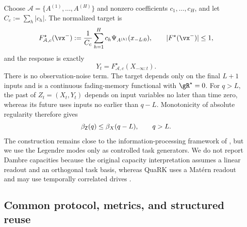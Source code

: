 Choose $\mathcal A=\{A^{(1)},\ldots,A^{(H)}\}$ and nonzero coefficients
$c_1,\ldots,c_H$, and let $C_c:=\sum_h|c_h|$.  The normalized target is
\begin{equation}
    F_{\mathcal A,c}^\star(\vx^-)
    :=\frac1{C_c}\sum_{h=1}^{H}c_h\Psi_{A^{(h)}}(x_{-L:0}),
    \qquad |F^\star(\vx^-)|\leq1,
    \label{eq:empirical-target-functional}
\end{equation}
and the response is exactly
\begin{equation}
    Y_t=F^\star_{\mathcal A,c}(X_{-\infty:t}).
    \label{eq:empirical-response}
\end{equation}
There is no observation-noise term.  The target depends only on the final
$L+1$ inputs and is a continuous fading-memory functional with
$\risk^\star=0$.  For $q>L$, the past of $Z_t=(X_t,Y_t)$ depends on input
variables no later than time zero, whereas its future uses inputs no earlier
than $q-L$.  Monotonicity of absolute regularity therefore gives
\begin{equation}
    \beta_{\mathsf Z}(q)\leq\beta_X(q-L),
    \qquad q>L.
    \label{eq:empirical-beta-shift}
\end{equation}
The construction remains close to the information-processing framework of
\citet{DambreEtAl2012}, but we use the Legendre modes only as controlled task
generators.  We do not report Dambre capacities because the original capacity
interpretation assumes a linear readout and an orthogonal task basis, whereas
QuaRK uses a Mat\'ern readout and may use temporally correlated drives
\citep{HulserEtAl2023}.

\subsection{Common protocol, metrics, and structured reuse}
\label{sec:empirical-common-protocol}

